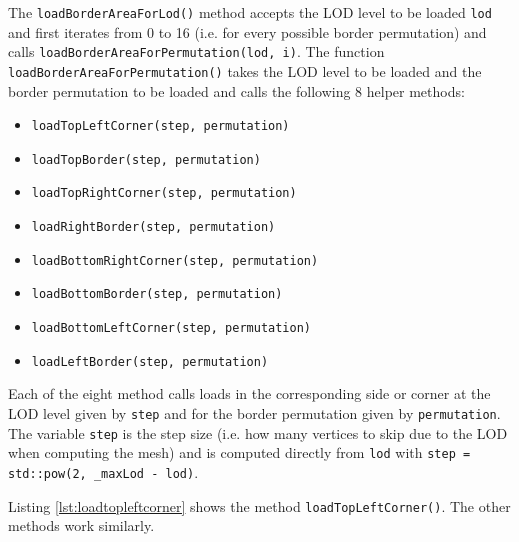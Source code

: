 The \texttt{loadBorderAreaForLod()} method accepts the LOD level to be loaded \texttt{lod} and first iterates from 0 to 16 
(i.e. for every possible border permutation) and calls \texttt{loadBorderAreaForPermutation(lod, i)}.
The function \texttt{loadBorderAreaForPermutation()} takes the LOD level to be loaded and the 
border permutation to be loaded and calls the following 8 helper methods:
\begin{itemize}
  \item \texttt{loadTopLeftCorner(step, permutation)}
  \item \texttt{loadTopBorder(step, permutation)}
  \item \texttt{loadTopRightCorner(step, permutation)}
  \item \texttt{loadRightBorder(step, permutation)}
  \item \texttt{loadBottomRightCorner(step, permutation)}
  \item \texttt{loadBottomBorder(step, permutation)}
  \item \texttt{loadBottomLeftCorner(step, permutation)}
  \item \texttt{loadLeftBorder(step, permutation)}
\end{itemize}

Each of the eight method calls loads in the corresponding side or corner 
at the LOD level given by \texttt{step} and for the border permutation
given by \texttt{permutation}. The variable \texttt{step} 
is the step size (i.e. how many vertices to skip due to the LOD when computing the mesh)
and is computed directly from \texttt{lod} with \texttt{step = std::pow(2, \_maxLod - lod)}.

Listing \ref{lst:loadtopleftcorner} shows the method \texttt{loadTopLeftCorner()}.
The other methods work similarly.

